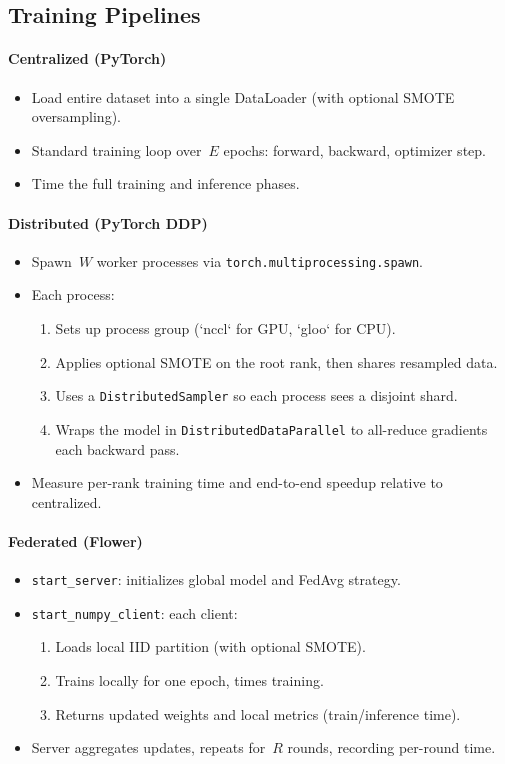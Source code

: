 \documentclass[10pt]{article}
\begin{document}
\subsection*{Training Pipelines}
\paragraph{Centralized (PyTorch)}  
\begin{itemize}
  \item Load entire dataset into a single DataLoader (with optional SMOTE oversampling).
  \item Standard training loop over $E$ epochs: forward, backward, optimizer step.
  \item Time the full training and inference phases.
\end{itemize}

\paragraph{Distributed (PyTorch DDP)}  
\begin{itemize}
  \item Spawn $W$ worker processes via \texttt{torch.multiprocessing.spawn}.
  \item Each process:
    \begin{enumerate}
      \item Sets up process group (`nccl` for GPU, `gloo` for CPU).
      \item Applies optional SMOTE on the root rank, then shares resampled data.
      \item Uses a \texttt{DistributedSampler} so each process sees a disjoint shard.
      \item Wraps the model in \texttt{DistributedDataParallel} to all-reduce gradients each backward pass.
    \end{enumerate}
  \item Measure per-rank training time and end-to-end speedup relative to centralized.
\end{itemize}

\paragraph{Federated (Flower)}  
\begin{itemize}
  \item \texttt{start\_server}: initializes global model and FedAvg strategy.
  \item \texttt{start\_numpy\_client}: each client:
    \begin{enumerate}
      \item Loads local IID partition (with optional SMOTE).
      \item Trains locally for one epoch, times training.
      \item Returns updated weights and local metrics (train/inference time).
    \end{enumerate}
  \item Server aggregates updates, repeats for $R$ rounds, recording per-round time.
\end{itemize}
\end{document}
